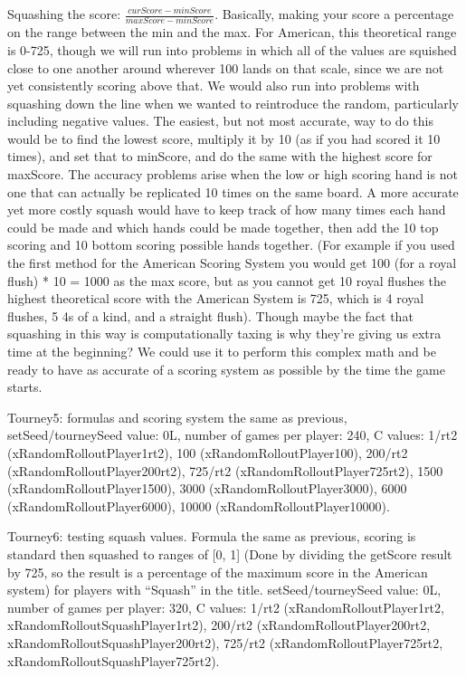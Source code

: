 \documentclass[letterpaper]{article}
\begin{document}
Squashing the score:  $\frac{curScore - minScore}{maxScore - minScore}$. Basically, making your score a percentage on the range between the min and the max. For American, this theoretical range is 0-725, though we will run into problems in which all of the values are squished close to one another around wherever 100 lands on that scale, since we are not yet consistently scoring above that. We would also run into problems with squashing down the line when we wanted to reintroduce the random, particularly including negative values. The easiest, but not most accurate, way to do this would be to find the lowest score, multiply it by 10 (as if you had scored it 10 times), and set that to minScore, and do the same with the highest score for maxScore. The accuracy problems arise when the low or high scoring hand is not one that can actually be replicated 10 times on the same board. A more accurate yet more costly squash would have to keep track of how many times each hand could be made and which hands could be made together, then add the 10 top scoring and 10 bottom scoring possible hands together. (For example if you used the first method for the American Scoring System you would get 100 (for a royal flush) * 10 = 1000 as the max score, but as you cannot get 10 royal flushes the highest theoretical score with the American System is 725, which is 4 royal flushes, 5 4s of a kind, and a straight flush). Though maybe the fact that squashing in this way is computationally taxing is why they’re giving us extra time at the beginning? We could use it to perform this complex math and be ready to have as accurate of a scoring system as possible by the time the game starts. 

Tourney5: formulas and scoring system the same as previous, setSeed/tourneySeed value: 0L,  number of games per player: 240, C values:
1/rt2 (xRandomRolloutPlayer1rt2), 
100 (xRandomRolloutPlayer100),
200/rt2 (xRandomRolloutPlayer200rt2), 
725/rt2 (xRandomRolloutPlayer725rt2), 
1500 (xRandomRolloutPlayer1500), 
3000 (xRandomRolloutPlayer3000), 
6000 (xRandomRolloutPlayer6000), 
10000 (xRandomRolloutPlayer10000).

Tourney6: testing squash values. Formula the same as previous, scoring is standard then squashed to ranges of [0, 1] (Done by dividing the getScore result by 725, so the result is a percentage of the maximum score in the American system) for players with “Squash” in the title. setSeed/tourneySeed value: 0L, number of games per player: 320, C values: 
1/rt2 (xRandomRolloutPlayer1rt2, xRandomRolloutSquashPlayer1rt2),
200/rt2 (xRandomRolloutPlayer200rt2, xRandomRolloutSquashPlayer200rt2),
725/rt2 (xRandomRolloutPlayer725rt2, xRandomRolloutSquashPlayer725rt2).
\end{document}
